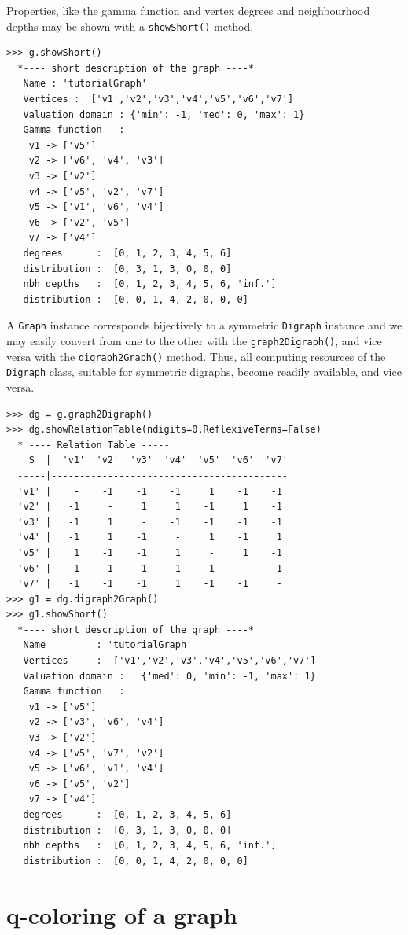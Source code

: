 Properties, like the gamma function and vertex degrees and neighbourhood depths may be shown with a \texttt{showShort()} method.
\begin{lstlisting}
>>> g.showShort()
  *---- short description of the graph ----*
   Name : 'tutorialGraph'
   Vertices :  ['v1','v2','v3','v4','v5','v6','v7']
   Valuation domain : {'min': -1, 'med': 0, 'max': 1}
   Gamma function   : 
    v1 -> ['v5']
    v2 -> ['v6', 'v4', 'v3']
    v3 -> ['v2']
    v4 -> ['v5', 'v2', 'v7']
    v5 -> ['v1', 'v6', 'v4']
    v6 -> ['v2', 'v5']
    v7 -> ['v4']
   degrees      :  [0, 1, 2, 3, 4, 5, 6]
   distribution :  [0, 3, 1, 3, 0, 0, 0]
   nbh depths   :  [0, 1, 2, 3, 4, 5, 6, 'inf.']
   distribution :  [0, 0, 1, 4, 2, 0, 0, 0]
\end{lstlisting}

A \texttt{Graph} instance corresponds bijectively to a symmetric \texttt{Digraph} instance and we may easily convert from one to the other with the \texttt{graph2Digraph()}, and vice versa with the \texttt{digraph2Graph()} method. Thus, all computing resources of the \texttt{Digraph} class, suitable for symmetric digraphs, become readily available, and vice versa.
\begin{lstlisting}
>>> dg = g.graph2Digraph()
>>> dg.showRelationTable(ndigits=0,ReflexiveTerms=False)
  * ---- Relation Table -----
    S  |  'v1'  'v2'  'v3'  'v4'  'v5'  'v6'  'v7'	  
  -----|------------------------------------------
  'v1' |    -    -1    -1    -1     1    -1    -1	 
  'v2' |   -1     -     1     1    -1     1    -1	 
  'v3' |   -1     1     -    -1    -1    -1    -1	 
  'v4' |   -1     1    -1     -     1    -1     1	 
  'v5' |    1    -1    -1     1     -     1    -1	 
  'v6' |   -1     1    -1    -1     1     -    -1	 
  'v7' |   -1    -1    -1     1    -1    -1     -
>>> g1 = dg.digraph2Graph()
>>> g1.showShort()
  *---- short description of the graph ----*
   Name         : 'tutorialGraph'
   Vertices     :  ['v1','v2','v3','v4','v5','v6','v7']
   Valuation domain :   {'med': 0, 'min': -1, 'max': 1}
   Gamma function   : 
    v1 -> ['v5']
    v2 -> ['v3', 'v6', 'v4']
    v3 -> ['v2']
    v4 -> ['v5', 'v7', 'v2']
    v5 -> ['v6', 'v1', 'v4']
    v6 -> ['v5', 'v2']
    v7 -> ['v4']
   degrees      :  [0, 1, 2, 3, 4, 5, 6]
   distribution :  [0, 3, 1, 3, 0, 0, 0]
   nbh depths   :  [0, 1, 2, 3, 4, 5, 6, 'inf.']
   distribution :  [0, 0, 1, 4, 2, 0, 0, 0]
\end{lstlisting}

\section{q-coloring of a graph}
\label{25.2}

